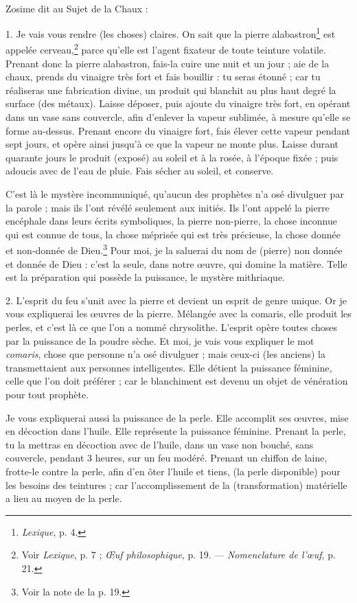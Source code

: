 \documentclass[landscape, a4paper, 11pt, oneside, polutonikogreek, french]{article}
\begin{document}
\paragraph{}
Zosime dit au Sujet de la Chaux :

1. Je vais vous rendre (les choses) claires. On sait que la pierre alabastron\footnote{\emph{Lexique}, p. 4.} est appelée cerveau,\footnote{Voir \emph{Lexique}, p. 7 ; \emph{Œuf philosophique}, p. 19. --- \emph{Nomenclature de l'œuf}, p. 21.} parce qu'elle est l'agent fixateur de toute teinture volatile. Prenant donc la pierre alabastron, fais-la cuire une nuit et un jour ; aie de la chaux, prends du vinaigre très fort et fais bouillir : tu seras étonné ; car tu réaliseras une fabrication divine, un produit qui blanchit au plus haut degré la surface (des métaux). Laisse déposer, puis ajoute du vinaigre très fort, en opérant dans un vase sans couvercle, afin d'enlever la vapeur sublimée, à mesure qu'elle se forme au-dessus. Prenant encore du vinaigre fort, fais élever cette vapeur pendant sept jours, et opère ainsi jusqu'à ce que la vapeur ne monte plus. Laisse durant quarante jours le produit (exposé) au soleil et à la rosée, à l'époque fixée ; puis adoucis avec de l'eau de pluie. Fais sécher au soleil, et conserve.

C'est là le mystère incommuniqué, qu'aucun des prophètes n'a osé divulguer par la parole ; mais ils l'ont révélé seulement aux initiés. Ils l'ont appelé la pierre encéphale dans leurs écrits symboliques, la pierre non-pierre, la chose inconnue qui est connue de tous, la chose méprisée qui est très précieuse, la chose donnée et non-donnée de Dieu.\footnote{Voir la note de la p. 19.} Pour moi, je la saluerai du nom de (pierre) non donnée et donnée de Dieu : c'est la seule, dans notre œuvre, qui domine la matière. Telle est la préparation qui possède la puissance, le mystère mithriaque.

2. L'esprit du feu s'unit avec la pierre et devient un esprit de genre unique. Or je vous expliquerai les œuvres de la pierre. Mélangée avec la comaris, elle produit les perles, et c'est là ce que l'on a nommé chrysolithe. L'esprit opère toutes choses par la puissance de la poudre sèche. Et moi, je vais vous expliquer le mot \emph{comaris}, chose que personne n'a osé divulguer ; mais ceux-ci (les anciens) la transmettaient aux personnes intelligentes. Elle détient la puissance féminine, celle que l'on doit préférer ; car le blanchiment est devenu un objet de vénération pour tout prophète.

Je vous expliquerai aussi la puissance de la perle. Elle accomplit ses œuvres, mise en décoction dans l'huile. Elle représente la puissance féminine. Prenant la perle, tu la mettras en décoction avec de l'huile, dans un vase non bouché, sans couvercle, pendant 3 heures, sur un feu modéré. Prenant un chiffon de laine, frotte-le contre la perle, afin d'en ôter l'huile et tiens, (la perle disponible) pour les besoins des teintures ; car l'accomplissement de la (transformation) matérielle a lieu au moyen de la perle.
\end{document}
